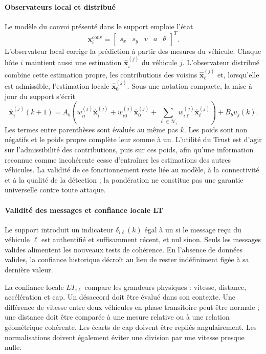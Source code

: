\documentclass[11pt,a4paper]{article}
\begin{document}
\paragraph{Observateurs local et distribué}
Le modèle du convoi présenté dans le support emploie l'état
\begin{equation}
\boldsymbol{x}^{\mathrm{conv}}_i=
\begin{bmatrix}s_x&s_y&v&a&\theta\end{bmatrix}^{T}.
\end{equation}
L'observateur local corrige la prédiction à partir des mesures du véhicule. Chaque hôte $i$ maintient aussi une estimation $\widehat{\boldsymbol{x}}_i^{(j)}$ du véhicule $j$. L'observateur distribué combine cette estimation propre, les contributions des voisins $\widehat{\boldsymbol{x}}_\ell^{(j)}$ et, lorsqu'elle est admissible, l'estimation locale $\widehat{\boldsymbol{x}}_0^{(j)}$. Sous une notation compacte, la mise à jour du support s'écrit
\begin{equation}
\widehat{\boldsymbol{x}}_i^{(j)}(k+1)=
A_b\!\left(w_{ii}^{(j)}\widehat{\boldsymbol{x}}_i^{(j)}
+w_{i0}^{(j)}\widehat{\boldsymbol{x}}_0^{(j)}
+\sum_{\ell\in\mathcal{N}_i}w_{i\ell}^{(j)}\widehat{\boldsymbol{x}}_\ell^{(j)}\right)
+B_bu_j(k).
\end{equation}
Les termes entre parenthèses sont évalués au même pas $k$. Les poids sont non négatifs et le poids propre complète leur somme à un. L'utilité du Trust est d'agir sur l'admissibilité des contributions, puis sur ces poids, afin qu'une information reconnue comme incohérente cesse d'entraîner les estimations des autres véhicules. La validité de ce fonctionnement reste liée au modèle, à la connectivité et à la qualité de la détection ; la pondération ne constitue pas une garantie universelle contre toute attaque.

\paragraph{Validité des messages et confiance locale LT}
Le support introduit un indicateur $\delta_{i\ell}(k)$ égal à un si le message reçu du véhicule $\ell$ est authentifié et suffisamment récent, et nul sinon. Seuls les messages valides alimentent les nouveaux tests de cohérence. En l'absence de données valides, la confiance historique décroît au lieu de rester indéfiniment figée à sa dernière valeur.

La confiance locale $LT_{i\ell}$ compare les grandeurs physiques : vitesse, distance, accélération et cap. Un désaccord doit être évalué dans son contexte. Une différence de vitesse entre deux véhicules en phase transitoire peut être normale ; une distance doit être comparée à une mesure relative ou à une relation géométrique cohérente. Les écarts de cap doivent être repliés angulairement. Les normalisations doivent également éviter une division par une vitesse presque nulle.
\end{document}
